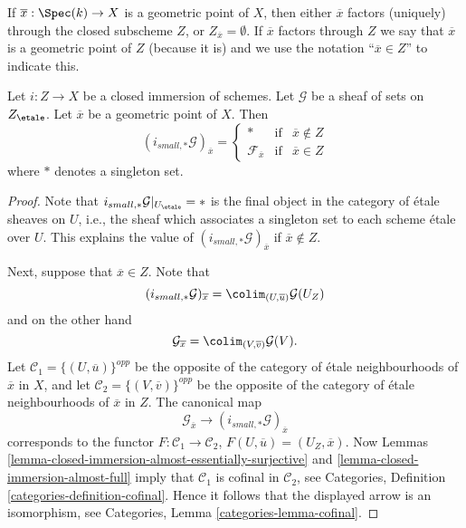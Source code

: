 \noindent
If $\overline{x} : \Spec(k) \to X$ is a geometric point of $X$, then
either $\overline{x}$ factors (uniquely) through the closed subscheme $Z$, or
$Z_{\overline{x}} = \emptyset$. If $\overline{x}$ factors through $Z$
we say that $\overline{x}$ is a geometric point of $Z$ (because it is) and
we use the notation ``$\overline{x} \in Z$'' to indicate this.

\begin{lemma}
\label{lemma-stalk-pushforward-closed-immersion}
Let $i : Z \to X$ be a closed immersion of schemes.
Let $\mathcal{G}$ be a sheaf of sets on $Z_\etale$.
Let $\overline{x}$ be a geometric point of $X$.
Then
$$
(i_{small, *}\mathcal{G})_{\overline{x}} =
\left\{
\begin{matrix}
* & \text{if} & \overline{x} \not \in Z \\
\mathcal{F}_{\overline{x}} & \text{if} & \overline{x} \in Z
\end{matrix}
\right.
$$
where $*$ denotes a singleton set.
\end{lemma}

\begin{proof}
Note that $i_{small, *}\mathcal{G}|_{U_\etale} = *$ is the final
object in the category of \'etale sheaves on $U$, i.e., the sheaf
which associates a singleton set to each scheme \'etale over $U$.
This explains the value of $(i_{small, *}\mathcal{G})_{\overline{x}}$
if $\overline{x} \not \in Z$.

\medskip\noindent
Next, suppose that $\overline{x} \in Z$. Note that
$$
(i_{small, *}\mathcal{G})_{\overline{x}}
=
\colim_{(U, \overline{u})} \mathcal{G}(U_Z)
$$
and on the other hand
$$
\mathcal{G}_{\overline{x}}
=
\colim_{(V, \overline{v})} \mathcal{G}(V).
$$
Let $\mathcal{C}_1 = \{(U, \overline{u})\}^{opp}$ be the opposite of the
category of \'etale neighbourhoods of $\overline{x}$ in $X$, and let
$\mathcal{C}_2 = \{(V, \overline{v})\}^{opp}$ be the opposite of the
category of \'etale neighbourhoods of $\overline{x}$ in $Z$. The canonical map
$$
\mathcal{G}_{\overline{x}}
\longrightarrow
(i_{small, *}\mathcal{G})_{\overline{x}}
$$
corresponds to the functor $F : \mathcal{C}_1 \to \mathcal{C}_2$,
$F(U, \overline{u}) = (U_Z, \overline{x})$. Now
Lemmas \ref{lemma-closed-immersion-almost-essentially-surjective} and
\ref{lemma-closed-immersion-almost-full}
imply that $\mathcal{C}_1$ is cofinal in $\mathcal{C}_2$, see
Categories, Definition \ref{categories-definition-cofinal}.
Hence it follows that the displayed arrow is an isomorphism, see
Categories, Lemma \ref{categories-lemma-cofinal}.
\end{proof}


